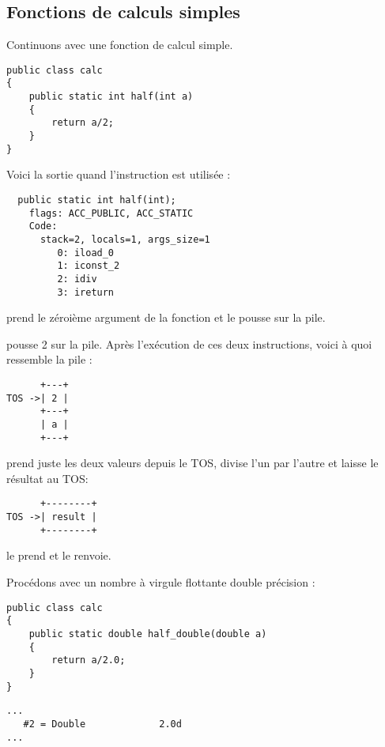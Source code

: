 \subsection{Fonctions de calculs simples}

Continuons avec une fonction de calcul simple.

\begin{lstlisting}[style=customjava]
public class calc
{
	public static int half(int a)
	{
		return a/2;
	}
}
\end{lstlisting}

Voici la sortie quand l'instruction  est utilisée :


\begin{lstlisting}
  public static int half(int);
    flags: ACC_PUBLIC, ACC_STATIC
    Code:
      stack=2, locals=1, args_size=1
         0: iload_0       
         1: iconst_2      
         2: idiv          
         3: ireturn       
\end{lstlisting}
         
 prend le zéroième argument de la fonction et le pousse sur la pile.

 pousse 2 sur la pile.
Après l'exécution de ces deux instructions, voici à quoi ressemble la pile :


\begin{lstlisting}
      +---+
TOS ->| 2 |
      +---+
      | a |
      +---+
\end{lstlisting}

 prend juste les deux valeurs depuis le \ac{TOS}, divise l'un par l'autre et laisse 
le résultat au \ac{TOS}:


\begin{lstlisting}
      +--------+
TOS ->| result |
      +--------+
\end{lstlisting}

 le prend et le renvoie.

Procédons avec un nombre à virgule flottante double précision :


\begin{lstlisting}[style=customjava]
public class calc
{
	public static double half_double(double a)
	{
		return a/2.0;
	}
}
\end{lstlisting}

\begin{lstlisting}[caption=Constant pool]
...
   #2 = Double             2.0d
...
\end{lstlisting}

